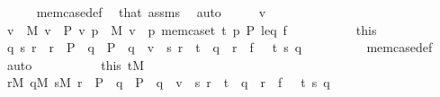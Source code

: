 \begin{isabellebody}
\ \ \ \ \isamarkupfalse%
\ mem{\isacharunderscore}{\kern0pt}case{\isacharunderscore}{\kern0pt}def\ \isamarkupfalse%
\ that\ assms\ \isamarkupfalse%
\ auto\isanewline
{}\isamarkupfalse%
\isanewline
\ \ \isacommand{{\isacharbraceleft}{\kern0pt}}\isamarkupfalse%
\ \isamarkupfalse%
\ v\isanewline
\ \ \ \ \isamarkupfalse%
\ {\isachardoublequoteopen}v\ {\isasymin}\ M{\isachardoublequoteclose}\ {\isachardoublequoteopen}v\ {\isasymin}\ P{\isachardoublequoteclose}\ {\isachardoublequoteopen}{\isasymlangle}v{\isacharcomma}{\kern0pt}\ p{\isasymrangle}\ {\isasymin}\ M{\isachardoublequoteclose}\ {\isachardoublequoteopen}v\ {\isasympreceq}\ p{\isachardoublequoteclose}\ {\isachardoublequoteopen}mem{\isacharunderscore}{\kern0pt}case{\isacharparenleft}{\kern0pt}t{}{\isacharcomma}{\kern0pt}\ t{}{\isacharcomma}{\kern0pt}\ p{\isacharcomma}{\kern0pt}\ P{\isacharcomma}{\kern0pt}\ leq{\isacharcomma}{\kern0pt}\ f{\isacharparenright}{\kern0pt}{\isachardoublequoteclose}\isanewline
\ \ \ \ \isamarkupfalse%
\isanewline
\ \ \ \ \isamarkupfalse%
\ this\isanewline
\ \ \ \ \isamarkupfalse%
\ q\ s\ r\ \ {\isachardoublequoteopen}r\ {\isasymin}\ P\ {\isasymand}\ q\ {\isasymin}\ P\ {\isasymand}\ q\ {\isasympreceq}\ v\ {\isasymand}\ {\isasymlangle}s{\isacharcomma}{\kern0pt}\ r{\isasymrangle}\ {\isasymin}\ t{}\ {\isasymand}\ q\ {\isasympreceq}\ r\ {\isasymand}\ f\ {\isacharbackquote}{\kern0pt}\ {\isasymlangle}{}{\isacharcomma}{\kern0pt}\ t{}{\isacharcomma}{\kern0pt}\ s{\isacharcomma}{\kern0pt}\ q{\isasymrangle}\ {\isacharequal}{\kern0pt}\ {}{\isachardoublequoteclose}\isanewline
\ \ \ \ \ \ \isamarkupfalse%
\ mem{\isacharunderscore}{\kern0pt}case{\isacharunderscore}{\kern0pt}def\ \isamarkupfalse%
\ auto\isanewline
\ \ \ \ \isamarkupfalse%
\isanewline
\ \ \ \ \isamarkupfalse%
\ this\ {\isacartoucheopen}t{}{\isasymin}M{\isacartoucheclose}\isanewline
\ \ \ \ \isamarkupfalse%
\ {\isachardoublequoteopen}r{\isasymin}M{\isachardoublequoteclose}\ {\isachardoublequoteopen}q{\isasymin}M{\isachardoublequoteclose}\ {\isachardoublequoteopen}s{\isasymin}M{\isachardoublequoteclose}\ {\isachardoublequoteopen}r\ {\isasymin}\ P\ {\isasymand}\ q\ {\isasymin}\ P\ {\isasymand}\ q\ {\isasympreceq}\ v\ {\isasymand}\ {\isasymlangle}s{\isacharcomma}{\kern0pt}\ r{\isasymrangle}\ {\isasymin}\ t{}\ {\isasymand}\ q\ {\isasympreceq}\ r\ {\isasymand}\ f\ {\isacharbackquote}{\kern0pt}\ {\isasymlangle}{}{\isacharcomma}{\kern0pt}\ t{}{\isacharcomma}{\kern0pt}\ s{\isacharcomma}{\kern0pt}\ q{\isasymrangle}\ {\isacharequal}{\kern0pt}\ {}{\isachardoublequoteclose}\isanewline

\end{isabellebody}
